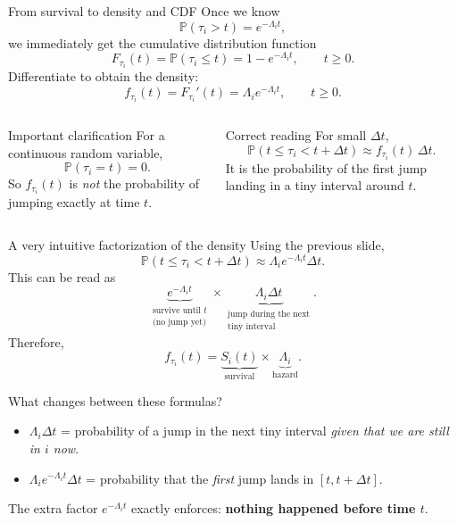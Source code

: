 \documentclass[aspectratio=169,professionalfonts]{beamer}
\newcommand{\Prob}{\mathbb{P}}
\begin{document}
\begin{frame}{From survival to density and CDF}
\small
Once we know
\[
\Prob(\tau_i>t)=e^{-\Lambda_i t},
\]
we immediately get the cumulative distribution function
\[
F_{\tau_i}(t)=\Prob(\tau_i\le t)=1-e^{-\Lambda_i t},\qquad t\ge 0.
\]
Differentiate to obtain the density:
\[
f_{\tau_i}(t)=F_{\tau_i}'(t)=\Lambda_i e^{-\Lambda_i t},\qquad t\ge 0.
\]

\begin{columns}[T,totalwidth=\textwidth]
\begin{block}{Important clarification}
For a continuous random variable,
\[
\Prob(\tau_i=t)=0.
\]
So $f_{\tau_i}(t)$ is \emph{not} the probability of jumping exactly at time $t$.
\end{block}
\begin{alertblock}{Correct reading}
For small $\Delta t$,
\[
\Prob(t\le \tau_i<t+\Delta t)
\approx f_{\tau_i}(t)\,\Delta t.
\]
It is the probability of the first jump landing in a tiny interval around $t$.
\end{alertblock}
\end{columns}
\end{frame}

\begin{frame}{A very intuitive factorization of the density}
\small
Using the previous slide,
\[
\Prob(t\le \tau_i<t+\Delta t)
\approx \Lambda_i e^{-\Lambda_i t}\Delta t.
\]
This can be read as
\[
\underbrace{e^{-\Lambda_i t}}_{\substack{\text{survive until }t \\\text{(no jump yet)}}}
\times
\underbrace{\Lambda_i\Delta t}_{\substack{\text{jump during the next}\\ \text{tiny interval}}}.
\]
Therefore,
\[
f_{\tau_i}(t)=\underbrace{S_i(t)}_{\text{survival}}\times \underbrace{\Lambda_i}_{\text{hazard}}.
\]

\begin{block}{What changes between these formulas?}
\begin{itemize}
  \item $\Lambda_i\Delta t$ = probability of a jump in the next tiny interval \emph{given that we are still in $i$ now}.
  \item $\Lambda_i e^{-\Lambda_i t}\Delta t$ = probability that the \emph{first} jump lands in $[t,t+\Delta t]$.
\end{itemize}
The extra factor $e^{-\Lambda_i t}$ exactly enforces: \textbf{nothing happened before time $t$}. 
\end{block}
\end{frame}
\end{document}
